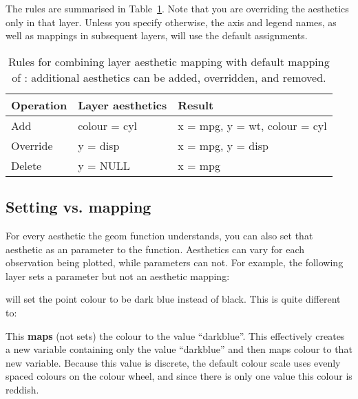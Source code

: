 % 


\noindent The rules are summarised in Table~\ref{tbl:aes-override}.  Note that you are overriding the aesthetics only in that layer.  Unless you specify otherwise, the axis and legend names, as well as mappings in subsequent layers, will use the default assignments. 

\begin{table}
  \begin{center}
  \begin{tabular}{lll}
    \toprule
    Operation & Layer aesthetics  & Result \\
    \midrule
    Add       & colour = cyl & x = mpg, y = wt, colour = cyl \\
    Override  & y = disp     & x = mpg, y = disp \\
    Delete    & y = NULL     & x = mpg \\
    \bottomrule
  \end{tabular}
  \end{center}
  \caption{Rules for combining layer aesthetic mapping with default mapping of :  additional aesthetics can be added, overridden, and removed.}
  \label{tbl:aes-override}
\end{table}


\subsection{Setting vs. mapping}
\label{sub:setting-mapping}

For every aesthetic the geom function understands, you can also set that aesthetic as an parameter to the function.  Aesthetics can vary for each observation being plotted, while parameters can not.  For example, the following layer sets a parameter but not an aesthetic mapping:

% 


\noindent will set the point colour to be dark blue instead of black.  This is quite different to:

% 


\noindent This {\bf maps} (not sets) the colour to the value ``darkblue''.  This effectively creates a new variable containing only the value  ``darkblue'' and then maps colour to that new variable.  Because this value is discrete, the default colour scale uses evenly spaced colours on the colour wheel, and since there is only one value this colour is reddish.

